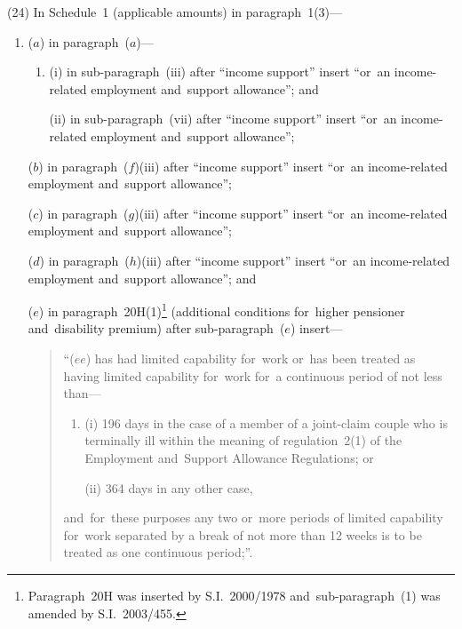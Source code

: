 \documentclass[12pt,a4paper]{article}
\begin{document}
(24) In Schedule~1 (applicable amounts) in paragraph~1(3)—
\begin{enumerate}\item[]
($a$) in paragraph~($a$)—
\begin{enumerate}\item[]
(i) in sub-paragraph~(iii)  after “income support” insert “or~an income-related employment and~support allowance”; and

(ii) in sub-paragraph~(vii)  after “income support” insert “or~an income-related employment and~support allowance”;
\end{enumerate}

($b$) in paragraph~($f$)(iii)  after “income support” insert “or~an income-related employment and~support allowance”;

($c$) in paragraph~($g$)(iii)  after “income support” insert “or~an income-related employment and~support allowance”;

($d$) in paragraph~($h$)(iii)  after “income support” insert “or~an income-related employment and~support allowance”; and

($e$) in paragraph~20H(1)\footnote{Paragraph~20H was inserted by S.I.~2000/1978 and~sub-paragraph~(1) was amended by S.I.~2003/455.} (additional conditions for~higher pensioner and~disability premium) after sub-paragraph~($e$)  insert—
\begin{quotation}
“($ee$) has had limited capability for~work or~has been treated as having limited capability for~work for~a continuous period of not less than—
\begin{enumerate}\item[]
(i) 196 days in the case of a member of a joint-claim couple who is terminally ill within the meaning of regulation~2(1) of the Employment and~Support Allowance Regulations; or

(ii) 364 days in any other case,
\end{enumerate}
and~for~these purposes any two or~more periods of limited capability for~work separated by a break of not more than 12 weeks is to be treated as one continuous period;”.
\end{quotation}
\end{enumerate}
\end{document}
